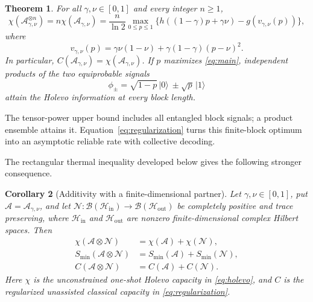 \documentclass[11pt]{article}
\newtheorem{theorem}{Theorem}[section]
\newtheorem{corollary}[theorem]{Corollary}
\theoremstyle{remark}
\newcommand{\A}{\mathcal A}
\newcommand{\ket}[1]{\lvert #1\rangle}
\numberwithin{equation}{section}
\begin{document}
\begin{theorem}\label{thm:main}
For all $\gamma,\nu\in[0,1]$ and every integer $n\ge1$,
\begin{equation}\label{eq:main}
 \chi(\A_{\gamma,\nu}^{\otimes n})
 =n\chi(\A_{\gamma,\nu})
 =\frac n{\ln2}\max_{0\le p\le1}
 \{h((1-\gamma)p+\gamma\nu)-g(v_{\gamma,\nu}(p))\},
\end{equation}
where
\begin{equation}\label{eq:v-main}
 v_{\gamma,\nu}(p)
 =\gamma\nu(1-\nu)+\gamma(1-\gamma)(p-\nu)^2.
\end{equation}
In particular, $C(\A_{\gamma,\nu})=\chi(\A_{\gamma,\nu})$.
If $p$ maximizes \eqref{eq:main}, independent products of the two
equiprobable signals
\begin{equation}\label{eq:pair}
 \phi_\pm=\sqrt{1-p}\,\ket0\ \pm\sqrt p\,\ket1
\end{equation}
attain the Holevo information at every block length.
\end{theorem}

The tensor-power upper bound includes all entangled block signals; a
product ensemble attains it. Equation~\eqref{eq:regularization} turns
this finite-block optimum into an asymptotic reliable rate with
collective decoding.

The rectangular thermal inequality developed below gives the following
stronger consequence.

\begin{corollary}[Additivity with a finite-dimensional partner]
\label{cor:partner-additivity}
Let $\gamma,\nu\in[0,1]$, put $\A=\A_{\gamma,\nu}$, and let
$\mathcal N:\mathcal B(\mathcal H_{\mathrm{in}})\to
\mathcal B(\mathcal H_{\mathrm{out}})$ be completely positive and
trace preserving, where $\mathcal H_{\mathrm{in}}$ and
$\mathcal H_{\mathrm{out}}$ are nonzero finite-dimensional complex
Hilbert spaces. Then
\begin{align}
 \chi(\A\otimes\mathcal N)
 &=\chi(\A)+\chi(\mathcal N),\label{eq:partner-holevo}\\
 S_{\min}(\A\otimes\mathcal N)
 &=S_{\min}(\A)+S_{\min}(\mathcal N),\label{eq:partner-min}\\
 C(\A\otimes\mathcal N)
 &=C(\A)+C(\mathcal N).\label{eq:partner-capacity}
\end{align}
Here $\chi$ is the unconstrained one-shot Holevo capacity in
\eqref{eq:holevo}, and $C$ is the regularized unassisted classical
capacity in \eqref{eq:regularization}.
\end{corollary}
\end{document}

